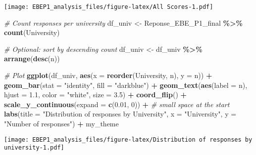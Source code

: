 \documentclass[
]{article}
\newenvironment{Shaded}{\begin{snugshade}}{\end{snugshade}}
\newcommand{\AttributeTok}[1]{\textcolor[rgb]{0.13,0.29,0.53}{#1}}
\newcommand{\CommentTok}[1]{\textcolor[rgb]{0.56,0.35,0.01}{\textit{#1}}}
\newcommand{\DecValTok}[1]{\textcolor[rgb]{0.00,0.00,0.81}{#1}}
\newcommand{\FloatTok}[1]{\textcolor[rgb]{0.00,0.00,0.81}{#1}}
\newcommand{\FunctionTok}[1]{\textcolor[rgb]{0.13,0.29,0.53}{\textbf{#1}}}
\newcommand{\NormalTok}[1]{#1}
\newcommand{\OtherTok}[1]{\textcolor[rgb]{0.56,0.35,0.01}{#1}}
\newcommand{\SpecialCharTok}[1]{\textcolor[rgb]{0.81,0.36,0.00}{\textbf{#1}}}
\newcommand{\StringTok}[1]{\textcolor[rgb]{0.31,0.60,0.02}{#1}}
\begin{document}
\texttt{[image: EBEP1\_analysis\_files/figure-latex/All Scores-1.pdf]}

\begin{Shaded}
\begin{Highlighting}[]
\CommentTok{\# Count responses per university}
\NormalTok{df\_univ }\OtherTok{\textless{}{-}}\NormalTok{ Reponse\_EBE\_P1\_final }\SpecialCharTok{\%\textgreater{}\%}
  \FunctionTok{count}\NormalTok{(University)}


\CommentTok{\# Optional: sort by descending count}
\NormalTok{df\_univ }\OtherTok{\textless{}{-}}\NormalTok{ df\_univ }\SpecialCharTok{\%\textgreater{}\%}
  \FunctionTok{arrange}\NormalTok{(}\FunctionTok{desc}\NormalTok{(n))}

\CommentTok{\# Plot}
\FunctionTok{ggplot}\NormalTok{(df\_univ, }\FunctionTok{aes}\NormalTok{(}\AttributeTok{x =} \FunctionTok{reorder}\NormalTok{(University, n), }\AttributeTok{y =}\NormalTok{ n)) }\SpecialCharTok{+}
  \FunctionTok{geom\_bar}\NormalTok{(}\AttributeTok{stat =} \StringTok{"identity"}\NormalTok{, }\AttributeTok{fill =} \StringTok{"darkblue"}\NormalTok{) }\SpecialCharTok{+}
  \FunctionTok{geom\_text}\NormalTok{(}\FunctionTok{aes}\NormalTok{(}\AttributeTok{label =}\NormalTok{ n),}
            \AttributeTok{hjust =} \FloatTok{1.1}\NormalTok{,}
            \AttributeTok{color =} \StringTok{"white"}\NormalTok{,}
            \AttributeTok{size =} \FloatTok{3.5}\NormalTok{) }\SpecialCharTok{+}
  \FunctionTok{coord\_flip}\NormalTok{() }\SpecialCharTok{+}
  \FunctionTok{scale\_y\_continuous}\NormalTok{(}\AttributeTok{expand =} \FunctionTok{c}\NormalTok{(}\FloatTok{0.01}\NormalTok{, }\DecValTok{0}\NormalTok{)) }\SpecialCharTok{+}  \CommentTok{\# small space at the start}
  \FunctionTok{labs}\NormalTok{(}\AttributeTok{title =} \StringTok{"Distribution of responses by University"}\NormalTok{,}
       \AttributeTok{x =} \StringTok{"University"}\NormalTok{,}
       \AttributeTok{y =} \StringTok{"Number of responses"}\NormalTok{) }\SpecialCharTok{+}
\NormalTok{  my\_theme}
\end{Highlighting}
\end{Shaded}

\texttt{[image: EBEP1\_analysis\_files/figure-latex/Distribution of responses by university-1.pdf]}
\end{document}
